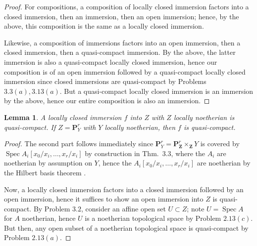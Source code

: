 \documentclass[12pt,letterpaper]{article}
\newtheorem{lemma}{Lemma}[section]
\theoremstyle{definition}
\theoremstyle{remark}
\numberwithin{equation}{section}
\numberwithin{figure}{problem}
\DeclareMathOperator{\Spec}{Spec}
\DeclareMathOperator{\id}{id}
\newcommand{\OO}{\mathcal{O}}
\begin{document}
\begin{proof}
  \par For compositions, a composition of locally closed immersion factors into a closed immersion, then an immersion, then an open immersion; hence, by the above, this composition is the same as a locally closed immersion.
  \par Likewise, a composition of immersions factors into an open immersion, then a closed immersion, then a quasi-compact immersion. By the above, the latter immersion is also a quasi-compact locally closed immersion, hence our composition is of an open immersion followed by a quasi-compact locally closed immersion since closed immersions are quasi-compact by Problems $3.3(a),3.13(a)$. But a quasi-compact locally closed immersion is an immersion by the above, hence our entire composition is also an immersion.
\end{proof}
\begin{lemma}\label{locnoethimm}
  A locally closed immersion $f$ into $Z$ with $Z$ locally noetherian is quasi-compact. If $Z = \mathbf{P}^r_Y$ with $Y$ locally noetherian, then $f$ is quasi-compact.
\end{lemma}
\begin{proof}
  The second part follows immediately since $\mathbf{P}^r_Y = \mathbf{P}^r_{\mathbf{Z}} \times_{\mathbf{Z}} Y$ is covered by $\Spec A_i[x_0/x_i,\ldots,x_r/x_i]$ by construction in Thm.~3.3, where the $A_i$ are noetherian by assumption on $Y$, hence the $A_i[x_0/x_i,\ldots,x_r/x_i]$ are noetherian by the Hilbert basis theorem \cite[Thm.~7.5]{AM69}.
  \par Now, a locally closed immersion factors into a closed immersion followed by an open immersion, hence it suffices to show an open immersion into $Z$ is quasi-compact. By Problem $3.2$, consider an affine open set $U \subset Z$; note $U = \Spec A$ for $A$ noetherian, hence $U$ is a noetherian topological space by Problem $2.13(c)$. But then, any open subset of a noetherian topological space is quasi-compact by Problem $2.13(a)$.
\end{proof}


\printbibliography
\end{document}
